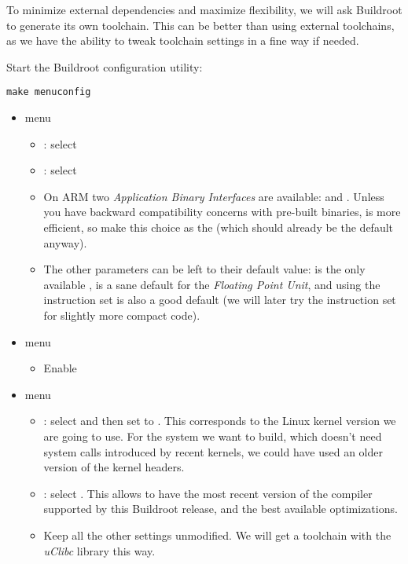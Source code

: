 To minimize external dependencies and maximize flexibility, we will ask
Buildroot to generate its own toolchain. This can be better than using
external toolchains, as we have the ability to tweak toolchain settings
in a fine way if needed.

Start the Buildroot configuration utility:

\begin{verbatim}
make menuconfig
\end{verbatim}

\begin{itemize}

\item {} menu
  \begin{itemize}

  \item {}: select 

  \item {}: select 

  \item On ARM two {\em Application Binary Interfaces} are available:
     and . Unless you have backward
    compatibility concerns with pre-built binaries,  is
    more efficient, so make this choice as the 
    (which should already be the default anyway).

  \item The other parameters can be left to their default value:
     is the only available ,
     is a sane default for the {\em Floating Point
      Unit}, and using the  instruction set is also a good
    default (we will later try the  instruction set for
    slightly more compact code).
  \end{itemize}

\item {} menu
  \begin{itemize}
  \item Enable 
  \end{itemize}

\item {} menu
  \begin{itemize}
  \item {}: select 
	and then set  to . This corresponds
	to the Linux kernel version we are going to use. For the system
	we want to build, which doesn't need system calls introduced
	by recent kernels, we could have used an older version of the
	kernel headers.
  \item {}: select . This allows
        to have the most recent version of the compiler supported by
	this Buildroot release, and the best available optimizations.
  \item Keep all the other settings unmodified. We will get
	a toolchain with the {\em uClibc} library this way.
  \end{itemize}


\end{itemize}
